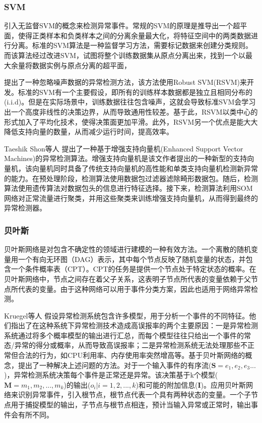 \subsubsection{SVM}
\citet{2002AEskin} 引入无监督SVM的概念来检测异常事件。常规的SVM的原理是推导出一个超平面，使得正类样本和负类样本之间的分离余量最大化，将特征空间中的两类数据进行分离。标准的SVM算法是一种监督学习方法，需要标记数据来创建分类规则。而该算法经过改进SVM，试图将整个训练数据集从原点分离出来，找到一个以最大余量将数据实例与原点分离的超平面，

\citet{Hu2003Robust} 提出了一种忽略噪声数据的异常检测方法，该方法使用Robust SVM(RSVM)来开发。标准的SVM有一个主要假设，即所有的训练样本数据都是独立且相同分布的(i.i.d)。但是在实际场景中，训练数据往往包含噪声，这就会导致标准SVM会学习出一个高度非线性的决策边界，从而导致通用性较差。基于此，RSVM以类中心的形式加入了平均化技术，使得决策面更加平滑。此外，RSVM另一个优点是能大大降低支持向量的数量，从而减少运行时间，提高效率。

Taeshik Shon等人\cite{shon2005machine} 提出了一种基于增强支持向量机(Enhanced Support Vector Machines)的异常检测算法。增强支持向量机是该文作者提出的一种新型的支持向量机，该向量机同时具备了传统支持向量机的高性能和单类支持向量机检测新异常的能力。在预处理阶段，检测算法使用数据包过滤器滤除畸形数据包。随后，检测算法使用遗传算法对数据包头的信息进行特征选择。接下来，检测算法利用SOM网络对正常流量进行聚类，并用这些聚类来训练增强支持向量机，从而得到最终的异常检测器。


\subsubsection{贝叶斯}

贝叶斯网络是对包含不确定性的领域进行建模的一种有效方法。一个离散的随机变量用一个有向无环图（DAG）表示，其中每个节点反映了随机变量的状态，并包含一个条件概率表（CPT）。CPT的任务是提供一个节点处于特定状态的概率。在贝叶斯网络中，节点之间存在着父子关系，这表明子节点所代表的变量依赖于父节点所代表的变量。由于这种网络可以用于事件分类方案，因此也适用于网络异常检测。

Kruegel等人\cite{kruegel2003bayesian} 假设异常检测系统包含许多模型，用于分析一个事件的不同特征。他们指出了在这种系统下异常检测技术造成高误报率的两个主要原因：一是异常检测系统通过将多个概率模型的输出进行汇总，而每个模型往往只给出一个事件的常态/异常的得分或概率，从而导致高误报率；二是异常检测系统无法处理那些不正常但合法的行为，如CPU利用率、内存使用率突然增高等。基于贝叶斯网络的概念，\citep{kruegel2003bayesian}提出了一种解决上述问题的方法。对于一个输入事件的有序流($\symbf{S}=e_1,e_2,e_3...$)，异常检测系统决策每个事件是正常还是异常。该决策基于k个模型($\symbf{M}=m_1,m_2,...,m_k$)的输出($o_i|i=1,2,...,k$)和可能的附加信息($\symbf{I}$)。应用贝叶斯网络来识别异常事件，引入根节点，根节点代表一个具有两种状态的变量。一个子节点用于捕捉模型的输出，子节点与根节点相连，预计当输入异常或正常时，输出事件会有所不同。

